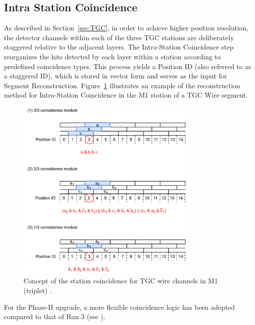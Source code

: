 \subsection{Intra Station Coincidence} \label{subsec:IntraCoin}
As described in Section~\ref{sec:TGC}, in order to achieve higher position resolution, the detector channels within each of the three TGC stations are deliberately staggered relative to the adjacent layers. The Intra-Station Coincidence step reorganizes the hits detected by each layer within a station according to predefined coincidence types. This process yields a Position ID (also referred to as a staggered ID), which is stored in vector form and serves as the input for Segment Reconstruction.
Figure~\ref{fig:IntraCoin} illustrates an example of the reconstruction method for Intra-Station Coincidence in the M1 station of a TGC Wire segment.

\begin{figure}[htbp]
  \centering
  \includegraphics[width=0.8\textwidth]{figs/chapter5/Intra_station_coincidence.png}
  \caption{Concept of the station coincidence for TGC wire channels in M1 (triplet) \cite{EndcapSLPDR}.}
  \label{fig:IntraCoin}
\end{figure}

For the Phase-II upgrade, a more flexible coincidence logic has been adopted compared to that of Run 3 (see \cite{yamashita}).
